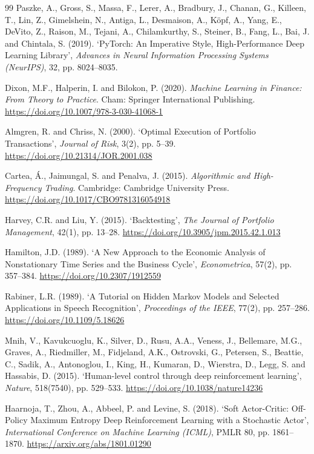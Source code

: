 \documentclass[11pt,a4paper]{article}
\begin{document}
\begin{thebibliography}{99}
 Paszke, A., Gross, S., Massa, F., Lerer, A., Bradbury, J., Chanan, G., Killeen, T., Lin, Z., Gimelshein, N., Antiga, L., Desmaison, A., K\"opf, A., Yang, E., DeVito, Z., Raison, M., Tejani, A., Chilamkurthy, S., Steiner, B., Fang, L., Bai, J. and Chintala, S. (2019). `PyTorch: An Imperative Style, High-Performance Deep Learning Library', \textit{Advances in Neural Information Processing Systems (NeurIPS)}, 32, pp. 8024--8035.

 Dixon, M.F., Halperin, I. and Bilokon, P. (2020). \textit{Machine Learning in Finance: From Theory to Practice}. Cham: Springer International Publishing. \url{https://doi.org/10.1007/978-3-030-41068-1}

 Almgren, R. and Chriss, N. (2000). `Optimal Execution of Portfolio Transactions', \textit{Journal of Risk}, 3(2), pp. 5--39. \url{https://doi.org/10.21314/JOR.2001.038}

 Cartea, \'A., Jaimungal, S. and Penalva, J. (2015). \textit{Algorithmic and High-Frequency Trading}. Cambridge: Cambridge University Press. \url{https://doi.org/10.1017/CBO9781316054918}

 Harvey, C.R. and Liu, Y. (2015). `Backtesting', \textit{The Journal of Portfolio Management}, 42(1), pp. 13--28. \url{https://doi.org/10.3905/jpm.2015.42.1.013}

 Hamilton, J.D. (1989). `A New Approach to the Economic Analysis of Nonstationary Time Series and the Business Cycle', \textit{Econometrica}, 57(2), pp. 357--384. \url{https://doi.org/10.2307/1912559}

 Rabiner, L.R. (1989). `A Tutorial on Hidden Markov Models and Selected Applications in Speech Recognition', \textit{Proceedings of the IEEE}, 77(2), pp. 257--286. \url{https://doi.org/10.1109/5.18626}

 Mnih, V., Kavukcuoglu, K., Silver, D., Rusu, A.A., Veness, J., Bellemare, M.G., Graves, A., Riedmiller, M., Fidjeland, A.K., Ostrovski, G., Petersen, S., Beattie, C., Sadik, A., Antonoglou, I., King, H., Kumaran, D., Wierstra, D., Legg, S. and Hassabis, D. (2015). `Human-level control through deep reinforcement learning', \textit{Nature}, 518(7540), pp. 529--533. \url{https://doi.org/10.1038/nature14236}

 Haarnoja, T., Zhou, A., Abbeel, P. and Levine, S. (2018). `Soft Actor-Critic: Off-Policy Maximum Entropy Deep Reinforcement Learning with a Stochastic Actor', \textit{International Conference on Machine Learning (ICML)}, PMLR 80, pp. 1861--1870. \url{https://arxiv.org/abs/1801.01290}


\end{thebibliography}
\end{document}
